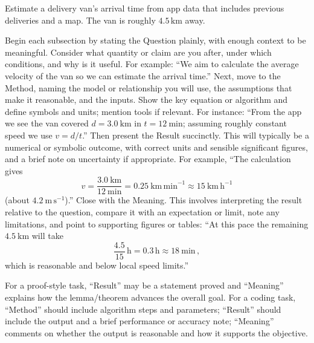 \documentclass[
  a4paper,
  DIV=11,
  numbers=noendperiod,
  oneside]{scrreprt}
\begin{document}
\begin{tcolorbox}[enhanced jigsaw, colframe=quarto-callout-note-color-frame, title=\textcolor{quarto-callout-note-color}{\faInfo}\hspace{0.5em}{A problem: Delivery van ETA}, breakable, opacityback=0, titlerule=0mm, colbacktitle=quarto-callout-note-color!10!white, toptitle=1mm, colback=white, coltitle=black, toprule=.15mm, bottomtitle=1mm, left=2mm, arc=.35mm, rightrule=.15mm, bottomrule=.15mm, opacitybacktitle=0.6, leftrule=.75mm]

Estimate a delivery van's arrival time from app data that includes
previous deliveries and a map. The van is roughly \(4.5\,\mathrm{km}\)
away.

\end{tcolorbox}

Begin each subsection by stating the Question plainly, with enough
context to be meaningful. Consider what quantity or claim are you after,
under which conditions, and why is it useful. For example: ``We aim to
calculate the average velocity of the van so we can estimate the arrival
time.'' Next, move to the Method, naming the model or relationship you
will use, the assumptions that make it reasonable, and the inputs. Show
the key equation or algorithm and define symbols and units; mention
tools if relevant. For instance: ``From the app we see the van covered
\(d=3.0~\mathrm{km}\) in \(t=12~\mathrm{min}\); assuming roughly
constant speed we use \(v=d/t\).'' Then present the Result succinctly.
This will typically be a numerical or symbolic outcome, with correct
units and sensible significant figures, and a brief note on uncertainty
if appropriate. For example, ``The calculation gives
\[v=\frac{3.0~\mathrm{km}}{12~\mathrm{min}}=0.25~\mathrm{km\,min}^{-1}\approx 15~\mathrm{km\,h}^{-1}\]
(about \(4.2~\mathrm{m\,s}^{-1}\)).'' Close with the Meaning. This
involves interpreting the result relative to the question, compare it
with an expectation or limit, note any limitations, and point to
supporting figures or tables: ``At this pace the remaining
\(4.5~\mathrm{km}\) will take
\[\frac{4.5}{15}\,\text{h}=0.3\,\mathrm{h}\approx 18~\mathrm{min}\,,\]
which is reasonable and below local speed limits.''

\begin{tcolorbox}[enhanced jigsaw, colframe=quarto-callout-tip-color-frame, title=\textcolor{quarto-callout-tip-color}{\faLightbulb}\hspace{0.5em}{Variants}, breakable, opacityback=0, titlerule=0mm, colbacktitle=quarto-callout-tip-color!10!white, toptitle=1mm, colback=white, coltitle=black, toprule=.15mm, bottomtitle=1mm, left=2mm, arc=.35mm, rightrule=.15mm, bottomrule=.15mm, opacitybacktitle=0.6, leftrule=.75mm]

For a proof-style task, ``Result'' may be a statement proved and
``Meaning'' explains how the lemma/theorem advances the overall goal.
For a coding task, ``Method'' should include algorithm steps and
parameters; ``Result'' should include the output and a brief performance
or accuracy note; ``Meaning'' comments on whether the output is
reasonable and how it supports the objective.

\end{tcolorbox}
\end{document}
